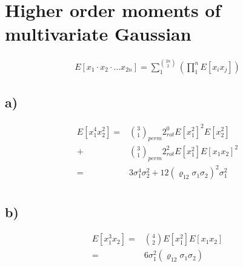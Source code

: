 \section{Higher order moments of multivariate Gaussian}
\begin{align}
	E[x_1\cdot x_2\cdot\dots x_{2n}] = \sum_1^{\binom{2n}{2}}\left( \prod_{1}^{n} E[x_ix_j] \right)
\end{align}

\subsection{a)}
\begin{align}
	E[x_1^4x_2^2]=&\binom{3}{1}_{perm} 2^0_{rot} E[x_1^2]^2 E[x_2^2]\\
	+&\binom{3}{1}_{perm} 2^2_{rot} E[x_1^2] E[x_1x_2]^2\\
	=&3\sigma_1^4\sigma_2^2 + 12(\varrho_{12}\sigma_1\sigma_2)^2\sigma_1^2\\
\end{align}
\subsection{b)}
\begin{align}
	E[x_1^3x_2]=&\binom{4}{2}E[x_1^2]E[x_1x_2]\\
	=&6\sigma_1^2(\varrho_{12}\sigma_1\sigma_2)
\end{align}